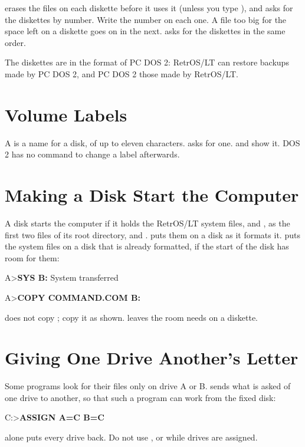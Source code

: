  erases the files on each diskette before it uses it (unless
you type ), and asks for the diskettes by number. Write the
number on each one. A file too big for the space left on a diskette goes
on in the next.  asks for the diskettes in the same order.

The diskettes are in the format of PC DOS 2: RetrOS/LT can restore
backups made by PC DOS 2, and PC DOS 2 those made by RetrOS/LT.

\section{Volume Labels}

A  is a name for a disk, of up to eleven characters.
 asks for one.  and  show it. DOS 2
has no command to change a label afterwards.

\section{Making a Disk Start the Computer}

A disk starts the computer if it holds the RetrOS/LT system files,
 and , as the first two files of its root
directory, and .  puts them on a disk as
it formats it.  puts the system files on a disk that is already
formatted, if the start of the disk has room for them:

\begin{dialogue}
A>\textbf{SYS B:}
System transferred

A>\textbf{COPY COMMAND.COM B:}
\end{dialogue}

 does not copy ; copy it as shown.
 leaves the room  needs on a diskette.

\section{Giving One Drive Another's Letter}

Some programs look for their files only on drive A or B. 
sends what is asked of one drive to another, so that such a program can
work from the fixed disk:

\begin{dialogue}
C:\bs>\textbf{ASSIGN A=C B=C}
\end{dialogue}

 alone puts every drive back. Do not use ,
 or  while drives are assigned.
